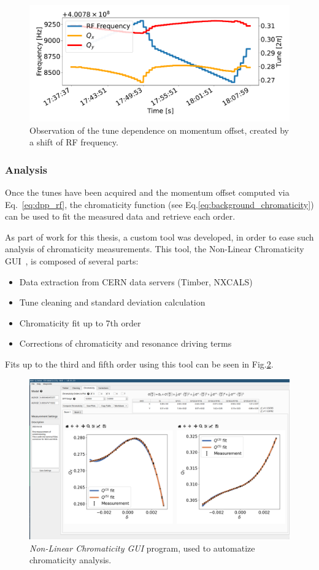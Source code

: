 \begin{figure}[H]
    \centering
    \includegraphics[width=1\textwidth]{images/rf_scan.pdf}
    \caption{Observation of the tune dependence on momentum offset, created by a shift of RF
             frequency.}
    \label{fig:measurements:rf_scan}
\end{figure}




\subsubsection{Analysis}

Once the tunes have been acquired and the momentum offset computed via Eq.~\eqref{eq:dpp_rf}, the
chromaticity function (see Eq.\eqref{eq:background_chromaticity}) can be used to fit the
measured data and retrieve each order.

As part of work for this thesis, a custom tool was developed, in order to ease such analysis of
chromaticity measurements. This tool, the Non-Linear Chromaticity
GUI~\cite{m_le_garrec_non-linear_2022}, is composed of several parts:

\begin{itemize}
    \tightlist
    \item Data extraction from CERN data servers (Timber, NXCALS)
    \item Tune cleaning and standard deviation calculation
    \item Chromaticity fit up to 7th order
    \item Corrections of chromaticity and resonance driving terms
\end{itemize}

Fits up to the third and fifth order using this tool can be seen in Fig.\ref{fig:chroma_gui}.

\begin{figure}[H]
    \includegraphics[width=\textwidth]{./images/chroma_gui.png}
    \caption{\textit{Non-Linear Chromaticity GUI} program, used to automatize chromaticity 
             analysis.}
    \label{fig:chroma_gui}
\end{figure}